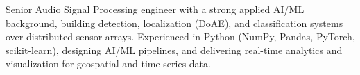 

\begin{cvparagraph}
    Senior Audio Signal Processing engineer with a strong applied AI/ML background, building detection, localization (DoAE), and classification systems over distributed sensor arrays.
    Experienced in Python (NumPy, Pandas, PyTorch, scikit-learn), designing AI/ML pipelines, and delivering real-time analytics and visualization for geospatial and time-series data.
\end{cvparagraph}